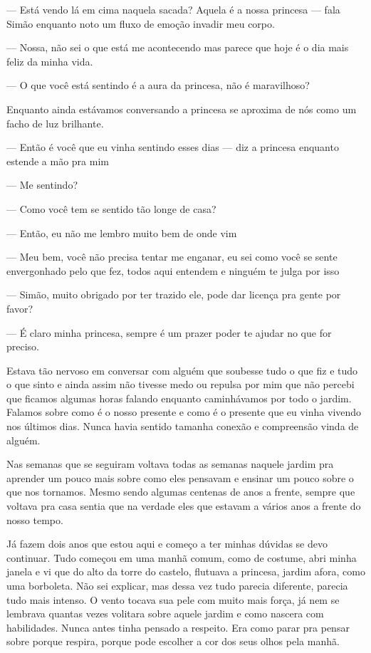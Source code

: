 — Está vendo lá em cima naquela sacada? Aquela é a nossa princesa — fala Simão enquanto noto um fluxo de emoção invadir meu corpo.

— Nossa, não sei o que está me acontecendo mas parece que hoje é o dia mais feliz da minha vida.

— O que você está sentindo é a aura da princesa, não é maravilhoso?

Enquanto ainda estávamos conversando a princesa se aproxima de nós como um facho de luz brilhante.

— Então é você que eu vinha sentindo esses dias — diz a princesa enquanto estende a mão pra mim

— Me sentindo? 

— Como você tem se sentido tão longe de casa?

— Então, eu não me lembro muito bem de onde vim

— Meu bem, você não precisa tentar me enganar, eu sei como você se sente envergonhado pelo que fez, todos aqui entendem e ninguém te julga por isso

— Simão, muito obrigado por ter trazido ele, pode dar licença pra gente por favor?

— É claro minha princesa, sempre é um prazer poder te ajudar no que for preciso.

Estava tão nervoso em conversar com alguém que soubesse tudo o que fiz e tudo o que sinto e ainda assim não tivesse medo ou repulsa por mim que não percebi que ficamos algumas horas falando enquanto caminhávamos por todo o jardim. Falamos sobre como é o nosso presente e como é o presente que eu vinha vivendo nos últimos dias. Nunca havia sentido tamanha conexão e compreensão vinda de alguém.

Nas semanas que se seguiram voltava todas as semanas naquele jardim pra aprender um pouco mais sobre como eles pensavam e ensinar um pouco sobre o que nos tornamos. Mesmo sendo algumas centenas de anos a frente, sempre que voltava pra casa sentia que na verdade eles que estavam a vários anos a frente do nosso tempo.

Já fazem dois anos que estou aqui e começo a ter minhas dúvidas se devo continuar. Tudo começou em uma manhã comum, como de costume, abri minha janela e vi que do alto da torre do castelo, flutuava a princesa, jardim afora, como uma borboleta. Não sei explicar, mas dessa vez tudo parecia diferente, parecia tudo mais intenso. O vento tocava sua pele com muito mais força, já nem se lembrava quantas vezes volitara sobre aquele jardim e como nascera com habilidades. Nunca antes tinha pensado a respeito. Era como parar pra pensar sobre porque respira, porque pode escolher a cor dos seus olhos pela manhã.

